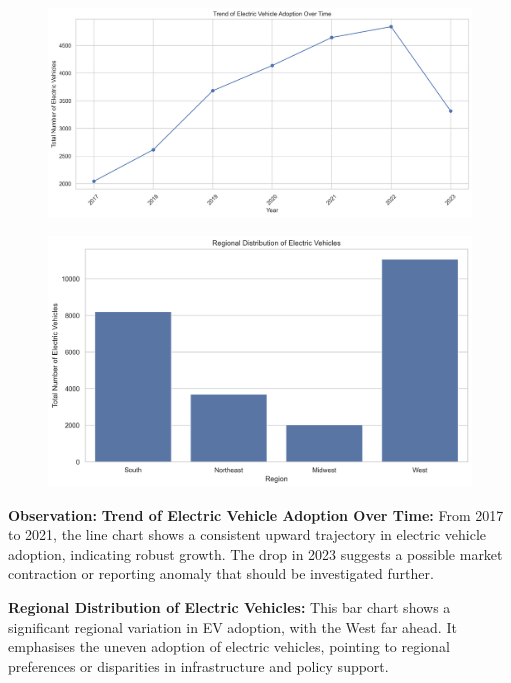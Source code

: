 \documentclass[
  letterpaper,
  DIV=11,
  numbers=noendperiod]{scrartcl}
\begin{document}
\begin{figure}[H]

{\centering \includegraphics{SummaryPaper_FinalProject_T1_files/figure-pdf/cell-10-output-1.png}

}

\end{figure}

\begin{figure}[H]

{\centering \includegraphics{SummaryPaper_FinalProject_T1_files/figure-pdf/cell-10-output-2.png}

}

\end{figure}

\textbf{Observation:} \textbf{Trend of Electric Vehicle Adoption Over
Time:} From 2017 to 2021, the line chart shows a consistent upward
trajectory in electric vehicle adoption, indicating robust growth. The
drop in 2023 suggests a possible market contraction or reporting anomaly
that should be investigated further.

\textbf{Regional Distribution of Electric Vehicles:} This bar chart
shows a significant regional variation in EV adoption, with the West far
ahead. It emphasises the uneven adoption of electric vehicles, pointing
to regional preferences or disparities in infrastructure and policy
support.
\end{document}
